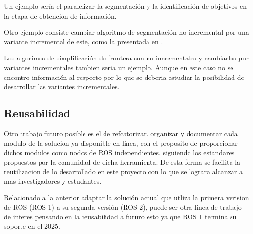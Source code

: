 Un ejemplo sería el paralelizar la segmentación y la identificación de
objetivos en la etapa de obtención de información.

Otro ejemplo consiste cambiar algoritmo de segmentación no incremental por una variante
incremental de este, como la presentada en \cite{Liu2015}. 

Los algorimos de simplificación de frontera son no incrementales y cambiarlos
por variantes incrementales tambien seria un ejemplo. Aunque en este caso no se
encontro información al respecto por lo que se deberia estudiar la posibilidad
de desarrollar las variantes incrementales.



\subsection{Reusabilidad}

Otro trabajo futuro posible es el de refcatorizar, organizar y documentar cada
modulo de la solucion ya disponible en linea, con el proposito de proporcionar
dichos modulos como nodos de ROS independientes, siguiendo los estandares
propuestos por la comunidad de dicha herramienta. De esta forma se facilita la
reutilizacion de lo desarrollado en este proyecto con lo que se lograra
alcanzar a mas investigadores y estudantes.

Relacionado a la anterior adaptar la solución actual que utliza la primera
verision de ROS (ROS 1) a su segunda versión (ROS 2), puede ser otra linea de
trabajo de interes pensando en la reusabilidad a fururo esto ya que ROS 1
termina su soporte en el 2025.






